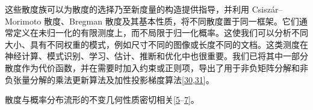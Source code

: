 这些散度族可以为散度的选择乃至新度量的构造提供指导，并利用 Csiszár–Morimoto 散度、Bregman 散度及其基本性质，将不同散度置于同一框架。它们通常定义在未归一化的有限测度上，而不局限于归一化概率。这使我们可以分析不同大小、具有不同权重的模式，例如尺寸不同的图像或长度不同的文档。这类测度在神经计算、模式识别、学习、估计、推断和优化中也很重要。我们已将其中一部分散度作为代价函数，并在需要时加入约束或正则项，导出了用于非负矩阵分解和非负张量分解的乘法更新算法及加性投影梯度算法[\hyperlink{B30-entropy-12-01532}{30},\allowbreak \hyperlink{B31-entropy-12-01532}{31}]。


散度与概率分布流形的不变几何性质密切相关[\hyperlink{B5-entropy-12-01532}{5}--\hyperlink{B7-entropy-12-01532}{7}]。

